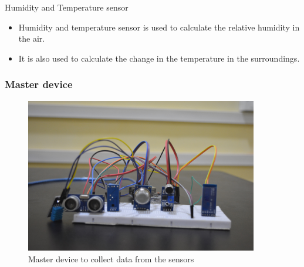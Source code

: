 \documentclass{beamer}
\begin{document}
 \begin{frame}
 \item Humidity and Temperature sensor
\begin{itemize}
\item Humidity and temperature sensor is used to calculate the relative humidity in the air.
\item It is also used to calculate the change in the temperature in the surroundings.
\end{itemize}
\end{frame}

\begin{frame}\frametitle{Master device}
\begin{itemize}
  \begin{figure}[H]
  \centerline{\includegraphics[width=4.0in]{master2.JPG}}
  \caption{ \textbf{}Master device to collect data from the sensors}
  \end{figure}
\end{itemize}
\end{frame}
\end{document}

